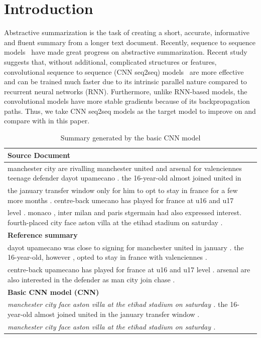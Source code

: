 \section{Introduction}
\label{sec:intro}
Abstractive summarization is the task of creating a short, accurate,
informative and fluent summary from a longer text document.
Recently, sequence to sequence
models~\cite{RushCW15,ChopraAR16,NallapatiZSGX16,SeeLM17,PaulusXS17,UniLM19}
have made great progress on abstractive summarization.
Recent study~\cite{bai2018empirical} suggests that, 
without additional, complicated structures or features,
convolutional sequence to sequence 
(CNN seq2seq) models~\cite{gehring2017convs2s,FanGA18,LiuLZ18} 
are more effective and can be trained much faster due to 
its intrinsic parallel nature compared to recurrent neural networks (RNN).
Furthermore, unlike RNN-based models, 
the convolutional models have more stable gradients 
because of its backpropagation paths. 
Thus, we take CNN seq2seq models as the target model to improve on and
compare with
in this paper.

\begin{table}[th!]
\centering
\scriptsize
\caption{Summary generated by the basic CNN model}
\begin{tabular}{|l|}
\hline \bf Source Document \\
\hline manchester city are rivalling manchester united and arsenal for valenciennes teenage defender dayot upamecano . the 16-year-old almost joined united in \\
	   the january transfer window only for him to opt to stay in france for a few more months . centre-back umecano has played for france at u16 and u17 \\
	   level . monaco , inter milan and paris stgermain had also expressed interest. fourth-placed city face aston villa at the etihad stadium on saturday . \\
\hline \bf Reference summary \\
\hline dayot upamecano was close to signing for manchester united in january . the 16-year-old, however , opted to stay in france with valenciennes . \\
	   centre-back upamecano has played for france at u16 and u17 level . arsenal are also interested in the defender as man city join chase . \\
\hline \bf Basic CNN model (CNN) \\
\hline \textit{manchester city face aston villa at the etihad stadium on saturday .} the 16-year-old almost joined united in the january transfer window . \\
	   \textit{manchester city face aston villa at the etihad stadium on saturday .}\\
\hline
\end{tabular}
\label{tab:example}
\end{table}


